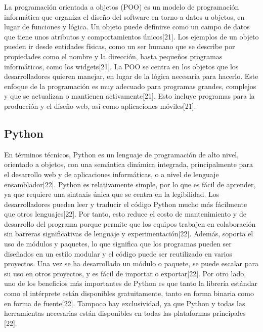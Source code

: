 \begin{list}{}%
    {\setlength{\leftmargin}{1cm}\setlength{\rightmargin}{1cm}}
    \item\relax
    \small

La programación orientada a objetos (POO) es un modelo de programación informática que organiza el diseño del software en torno a datos u objetos, en lugar de funciones y lógica. Un objeto puede definirse como un campo de datos que tiene unos atributos y comportamientos únicos[21].
Los ejemplos de un objeto pueden ir desde entidades físicas, como un ser humano que se describe por propiedades como el nombre y la dirección, hasta pequeños programas informáticos, como los widgets[21].
La POO se centra en los objetos que los desarrolladores quieren manejar, en lugar de la lógica necesaria para hacerlo. Este enfoque de la programación es muy adecuado para programas grandes, complejos y que se actualizan o mantienen activamente[21].
Esto incluye programas para la producción y el diseño web, así como aplicaciones móviles[21].

\end{list}

\subsection{Python}

\begin{list}{}%
    {\setlength{\leftmargin}{1cm}\setlength{\rightmargin}{1cm}}
    \item\relax
    \small

En términos técnicos, Python es un lenguaje de programación de alto nivel, orientado a objetos, con una semántica dinámica integrada, principalmente para el desarrollo web y de aplicaciones informáticas, o a nivel de lenguaje ensamblador[22].
Python es relativamente simple, por lo que es fácil de aprender, ya que requiere una sintaxis única que se centra en la legibilidad. Los desarrolladores pueden leer y traducir el código Python mucho más fácilmente que otros lenguajes[22].
Por tanto, esto reduce el costo de mantenimiento y de desarrollo del programa porque permite que los equipos trabajen en colaboración sin barreras significativas de lenguaje y experimentación[22].
Además, soporta el uso de módulos y paquetes, lo que significa que los programas pueden ser diseñados en un estilo modular y el código puede ser reutilizado en varios proyectos. Una vez se ha desarrollado un módulo o paquete, se puede escalar para su uso en otros proyectos, y es fácil de importar o exportar[22].
Por otro lado, uno de los beneficios más importantes de Python es que tanto la librería estándar como el intérprete están disponibles gratuitamente, tanto en forma binaria como en forma de fuente[22].
Tampoco hay exclusividad, ya que Python y todas las herramientas necesarias están disponibles en todas las plataformas principales [22].

\end{list}


